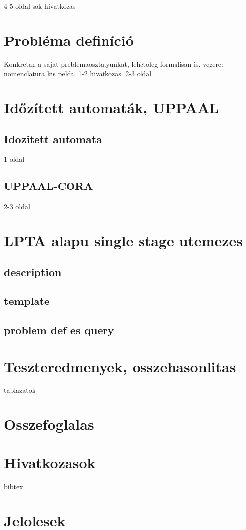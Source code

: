 \documentclass {report}
\begin{document}
4-5 oldal
sok hivatkozas


\chapter{Probléma definíció}
Konkretan a sajat problemaosztalyunkat, lehetoleg formalisan is.
vegere: nomenclatura
kis pelda.
1-2 hivatkozas.
2-3 oldal

\chapter{Időzített automaták, UPPAAL}
\section{Idozitett automata} 1 oldal
\section{UPPAAL-CORA} 2-3 oldal

\chapter{LPTA alapu single stage utemezes}
    \section{description}
    \section{template}
    \section{problem def es query}

\chapter{Teszteredmenyek, osszehasonlitas}
tablazatok

\chapter{Osszefoglalas}

\chapter*{Hivatkozasok}
bibtex

\appendix

\chapter{Jelolesek}
\end{document}
